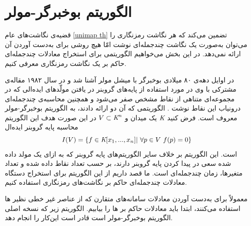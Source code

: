 \section{الگوریتم بوخبرگر-مولر}
قضیه‌ی نگاشت‌های عام
\ref{unimap th}
تضمین می‌کند که هر نگاشت رمزنگاری را می‌توان به‌صورت یک نگاشت چندجمله‌ای نوشت امّا هیچ روشی برای به‌دست آوردن آن ارائه نمی‌دهد. در این بخش می‌خواهیم الگوریتمی برای استخراج معادلات چندجمله‌ای حاکم بر یک نگاشت رمزنگاری معرفی کنیم. 

در اوایل دهه‌ی ۸۰ میلادی بوخبرگر با میشل مولر
آشنا شد و در سال ۱۹۸۲ مقاله‌ی مشترکی با وی در مورد استفاده از پایه‌های گروبنر در یافتن مولّد‌های ایده‌الی که در مجموعه‌ای متناهی از نقاط مشخص صفر می‌شود و همچنین محاسبه‌ی چندجمله‌ای درونیاب این نقاط نوشت
\cite{moller1982construction}.
الگوریتمی که آن دو ارائه دادند، به الگوریتم بوخبرگر-مولر
 معروف است. فرض کنید 
 $\textit{K}$
 یک میدان و 
 $V\subset \textit{K} ^{n}$
 در این صورت هدف این الگوریتم محاسبه‌  ‌پایه‌  گروبنر ایده‌ال 
 $$I(V) = \{f\in \textit{K}[x_{1},...,x_{n}] | \ \forall p\in V \ f(p) = 0\}$$
 است. این الگوریتم بر خلاف سایر الگوریتم‌های پایه‌  گروبنر که به ازای یک مولد داده شده سعی در پیدا کردن پایه گروبنر دارند، بر حسب تعداد نقاط داده شده و تعداد متغیرها، زمان چندجمله‌ای است.  ما قصد داریم از این الگوریتم برای استخراج دستگاه معادلات چندجمله‌ای حاکم بر نگاشت‌های رمزنگاری استفاده کنیم. 

معمولاً برای به‌دست آوردن معادلات سامانه‌های متقارن که از عناصر غیر خطی نظیر 
ها استفاده می‌کنند، ابتدا باید معادلات حاکم بر 
ها را بیابیم. الگوریتم زیر که نسخه‌ اصلی  الگوریتم بوخبرگر-مولر است قادر است این‌کار را انجام دهد. 


